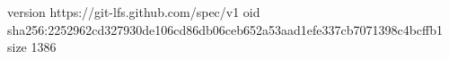 version https://git-lfs.github.com/spec/v1
oid sha256:2252962cd327930de106cd86db06ceb652a53aad1efe337cb7071398c4bcffb1
size 1386
